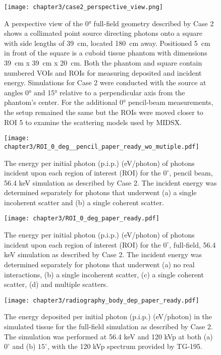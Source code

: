 \begin{figure}[H]
    \centering
    \texttt{[image: chapter3/case2\_perspective\_view.png]}
    \caption{A perspective view of the \ang{0} full-field geometry described by Case 2 shows a collimated point source directing photons onto a square with side lengths of \qty{39}{cm}, located \qty{180}{cm} away. Positioned \qty{5}{cm} in front of the square is a cuboid tissue phantom with dimensions \qty{39}{cm} x \qty{39}{cm} x \qty{20}{cm}. Both the phantom and square contain numbered VOIs and ROIs for measuring deposited and incident energy. Simulations for Case 2 were conducted with the source at angles \ang{0} and \ang{15} relative to a perpendicular axis from the phantom's center. For the additional \ang{0} pencil-beam measurements, the setup remained the same but the ROIs were moved closer to ROI 5 to examine the scattering models used by MIDSX.} 
    \label{fig:case2}
\end{figure}

\begin{figure}[H]
    \centering
	\texttt{[image: chapter3/ROI\_0\_deg\_\_pencil\_paper\_ready\_wo\_mutiple.pdf]}
	\caption{The energy per initial photon (p.i.p.) (eV/photon) of photons incident upon each region of interest (ROI) for the $0^\circ$, pencil beam, 56.4 keV simulation as described by Case 2. The incident energy was determined separately for photons that underwent (a) a single incoherent scatter and (b) a single coherent scatter.}
	\label{fig:ROIPGraph}
\end{figure}


\begin{figure}[H]
    \centering
	\texttt{[image: chapter3/ROI\_0\_deg\_paper\_ready.pdf]}
	\caption{The energy per initial photon (p.i.p.) (eV/photon) of photons incident upon each region of interest (ROI) for the $0^\circ$, full-field, 56.4 keV simulation as described by Case 2. The incident energy was determined separately for photons that underwent (a) no real interactions, (b) a single incoherent scatter, (c) a single coherent scatter, (d) and multiple scatters.}
	\label{fig:ROIFFGraph}
\end{figure}

\begin{figure}[H]
    \centering
	\texttt{[image: chapter3/radiography\_body\_dep\_paper\_ready.pdf]}
	\caption{The energy deposited per initial photon (p.i.p.) (eV/photon) in the simulated tissue for the full-field simulation as described by Case 2. The simulation was performed at 56.4 keV and 120 kVp at both (a) $0^\circ$ and (b) $15^\circ$, with the 120 kVp spectrum provided by TG-195.}
 	\label{fig:BDGraph}
\end{figure}


